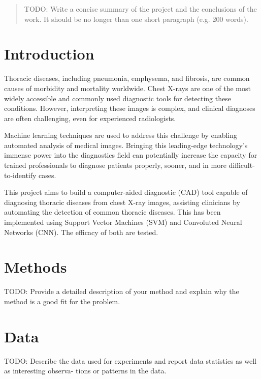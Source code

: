 \documentclass{article}
\theoremstyle{plain}
\theoremstyle{definition}
\theoremstyle{remark}
\begin{document}

\begin{abstract}
    TODO: Write a concise summary of the project and the conclusions of the work. It should be no longer
    than one short paragraph (e.g. 200 words).
\end{abstract}

\section{Introduction}
Thoracic diseases, including pneumonia, emphysema, and fibrosis, are common causes of morbidity and
mortality worldwide. Chest X-rays are one of the most widely accessible and commonly used diagnostic
tools for detecting these conditions. However, interpreting these images is complex, and clinical
diagnoses are often challenging, even for experienced radiologists.

Machine learning techniques are used to address this challenge by enabling automated analysis of
medical images. Bringing this leading-edge technology's immense power into the diagnostics field can
potentially increase the capacity for trained professionals to diagnose patients properly, sooner,
and in more difficult-to-identify cases.

This project aims to build a computer-aided diagnostic (CAD) tool capable of diagnosing thoracic
diseases from chest X-ray images, assisting clinicians by automating the detection of common thoracic
diseases. This has been implemented using Support Vector Machines (SVM) and Convoluted Neural Networks
(CNN). The efficacy of both are tested.


\section{Methods}
TODO: Provide a detailed description of your method and explain why the method is a good fit for
the problem.

\section{Data}
TODO: Describe the data used for experiments and report data statistics as well as interesting observa-
tions or patterns in the data.
\end{document}
